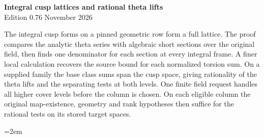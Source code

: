 \begin{center}
{\Large\bfseries Integral cusp lattices and rational theta lifts}\\[4pt]
Edition 0.76  November 2026
\end{center}

The integral cusp forms on a pinned geometric row form a full lattice.
The proof compares the analytic theta series with algebraic short
sections over the original field, then finds one denominator for
each section at every integral frame. A finer local calculation
recovers the source bound for each normalized torsion sum. On a
supplied family the
base class sums span the cusp space, giving rationality of the
theta lifts and the separating tests at both levels. One finite field request handles all higher
cover levels before the column is chosen. On each eligible column
the original map-existence, geometry and rank hypotheses then
suffice for the rational tests on its stored target spaces.

\begingroup\emergencystretch=2em




















\endgroup
